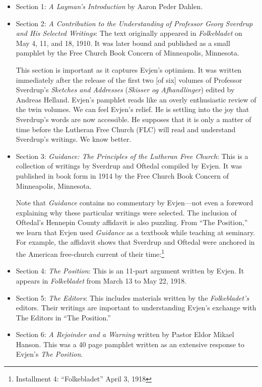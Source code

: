 \begin{itemize}

\item Section 1: \textit{A Layman's Introduction} by Aaron Peder Dahlen.

\item Section 2: \textit{A Contribution to the Understanding of Professor Georg Sverdrup and His Selected Writings}: The text originally appeared in \textit{Folkebladet} on May 4, 11, and 18, 1910. It was later bound and published as a small pamphlet by the Free Church Book Concern of Minneapolis, Minnesota. 

This section is important as it captures Evjen's optimism. It was written immediately after the release of the first two [of six] volumes of Professor Sverdrup's \textit{Sketches and Addresses} (\textit{Skisser og Afhandlinger}) edited by Andreas Helland. Evjen's pamphlet reads like an overly enthusiastic review of the twin volumes. We can feel Evjen's relief. He is settling into the joy that Sverdrup's words are now accessible. He supposes that it is only a matter of time before the Lutheran Free Church (FLC) will read and understand Sverdrup's writings. We know better.  

\item Section 3: \textit{Guidance: The Principles of the Lutheran Free Church}: This is a collection of writings by Sverdrup and Oftedal compiled by Evjen. It was published in book form in 1914 by the Free Church Book Concern of Minneapolis, Minnesota. 

Note that \textit{Guidance} contains no commentary by Evjen---not even a foreword explaining why these particular writings were selected. The inclusion of Oftedal's Hennepin County affidavit is also puzzling. From ``The Position,'' we learn that Evjen used \textit{Guidance} as a textbook while teaching at seminary. For example, the affidavit shows that Sverdrup and Oftedal were anchored in the American free-church current of their time:\footnote{Installment 4: “Folkebladet” April 3, 1918}

\item Section 4: \textit{The Position}: This is an 11-part argument written by Evjen. It appears in \textit{Folkebladet} from March 13 to May 22, 1918.

\item Section 5: \textit{The Editors}: This includes materials written by the \textit{Folkebladet's} editors. Their writings are important to understanding Evjen's exchange with The Editors in ``The Position.'' 

\item Section 6: \textit{A Rejoinder and a Warning} written by Pastor Eldor Mikael Hanson. This was a 40 page pamphlet written as an extensive response to Evjen's \textit{The Position}.
  
\end{itemize}



